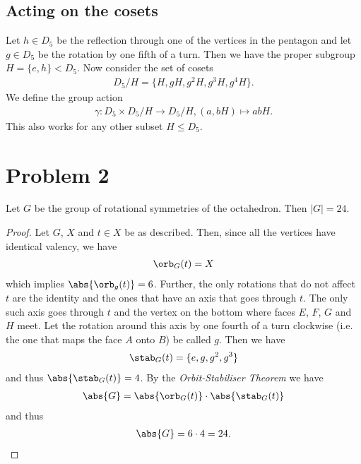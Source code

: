 \documentclass{article}
\begin{document}
\subsection*{Acting on the cosets}

Let $h\in D_5$ be the reflection through one of the vertices in the pentagon
and let $g\in D_5$ be the rotation by one fifth of a turn.
Then we have the proper subgroup $H=\{e, h\}<D_5$. Now consider the set of
cosets
\begin{align*}
	D_5/H=\{H, gH, g^2H, g^3H, g^4H\}.
\end{align*}
We define the group action
\begin{align*}
	\gamma: D_5\times D_5/H\to D_5/H,(a, bH)\mapsto abH.
\end{align*}
This also works for any other subset $H\leq D_5$.

\section*{Problem 2}

\begin{claim*}
	Let $G$ be the group of rotational symmetries of the octahedron. Then
	$|G|=24$.
\end{claim*}

\begin{proof}
	Let $G$, $X$ and $t\in X$ be as described. Then, since all the vertices
	have identical valency, we have
	\begin{align*}
		\orb_G(t) = X
	\end{align*}
	which implies $\abs{\orb_g(t)} = 6$. Further, the only rotations that
	do not affect $t$ are the identity and the ones that have an axis that
	goes through $t$. The only such axis goes through $t$ and the vertex on
	the bottom where faces $E$, $F$, $G$ and $H$ meet. Let the rotation
	around this axis by one fourth of a turn clockwise (i.e. the one that
	maps the face $A$ onto $B$) be called $g$. Then we have
	\begin{align*}
		\stab_G(t) = \{e, g, g^2, g^3\}
	\end{align*}
	and thus $\abs{\stab_G(t)} = 4$. By the \emph{Orbit-Stabiliser Theorem}
	we have
	\begin{align*}
		\abs{G} = \abs{\orb_G(t)}\cdot \abs{\stab_G(t)}
	\end{align*}
	and thus
	\begin{align*}
		\abs{G} = 6 \cdot 4 = 24.
	\end{align*}
\end{proof}
\end{document}
